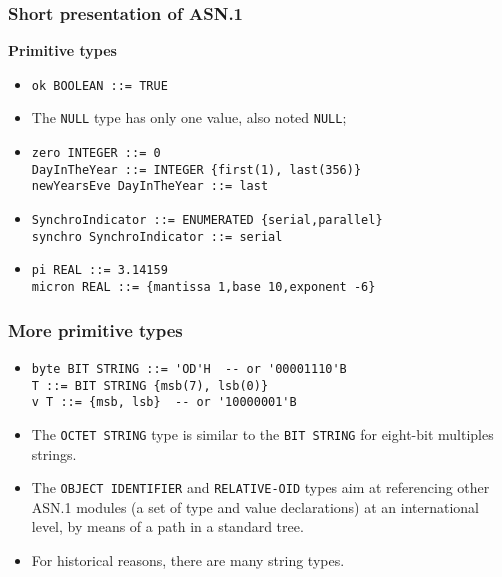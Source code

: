 \documentclass[compress,dvips,xcolor={dvipsnames},t]{beamer}
\newcommand\ASN{\textsf{ASN.1}\xspace}
\begin{document}
\begin{frame}[containsverbatim]
\frametitle{Short presentation of \ASN}

\noindent
\textbf{Primitive types}
\begin{itemize}

  \item \verb+ok BOOLEAN ::= TRUE+

  \item The \texttt{NULL} type has only one value, also noted
        \texttt{NULL};

  \item 

\begin{verbatim} 
zero INTEGER ::= 0 
DayInTheYear ::= INTEGER {first(1), last(356)}
newYearsEve DayInTheYear ::= last
\end{verbatim}

  \item 
\begin{verbatim}
SynchroIndicator ::= ENUMERATED {serial,parallel}
synchro SynchroIndicator ::= serial
\end{verbatim}

  \item

\begin{verbatim}
pi REAL ::= 3.14159
micron REAL ::= {mantissa 1,base 10,exponent -6}
\end{verbatim}

\end{itemize}

\end{frame}

\begin{frame}[containsverbatim]
\frametitle{More primitive types}

\begin{itemize}

  \item
\begin{verbatim}
byte BIT STRING ::= 'OD'H  -- or '00001110'B
T ::= BIT STRING {msb(7), lsb(0)}
v T ::= {msb, lsb}  -- or '10000001'B
\end{verbatim}

 \item The \texttt{OCTET STRING} type is similar to the \texttt{BIT
       STRING} for eight-bit multiples strings.

 \item The \texttt{OBJECT IDENTIFIER} and \texttt{RELATIVE-OID} types
       aim at referencing other \ASN modules (a set of type
       and value declarations) at an international level, by means of
       a path in a standard tree.

  \item For historical reasons, there are many string types.

\end{itemize}

\end{frame}
\end{document}
